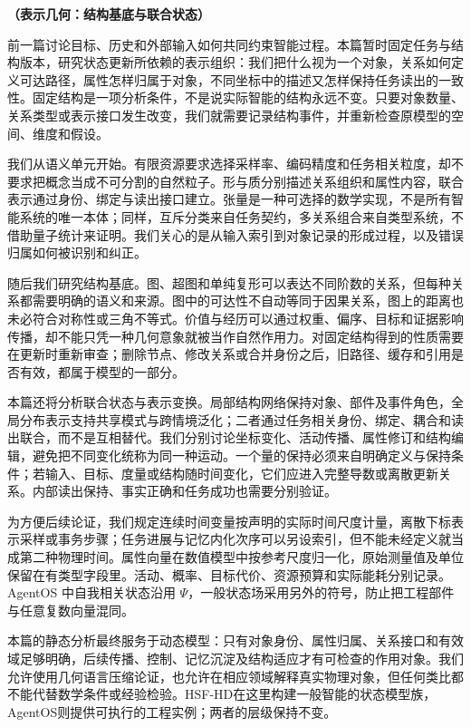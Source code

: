 \label{part:geometry}

\textbf{（表示几何：结构基底与联合状态）}


前一篇讨论目标、历史和外部输入如何共同约束智能过程。本篇暂时固定任务与结构版本，研究状态更新所依赖的表示组织：我们把什么视为一个对象，关系如何定义可达路径，属性怎样归属于对象，不同坐标中的描述又怎样保持任务读出的一致性。固定结构是一项分析条件，不是说实际智能的结构永远不变。只要对象数量、关系类型或表示接口发生改变，我们就需要记录结构事件，并重新检查原模型的空间、维度和假设。

我们从语义单元开始。有限资源要求选择采样率、编码精度和任务相关粒度，却不要求把概念当成不可分割的自然粒子。形与质分别描述关系组织和属性内容，联合表示通过身份、绑定与读出接口建立。张量是一种可选择的数学实现，不是所有智能系统的唯一本体；同样，互斥分类来自任务契约，多关系组合来自类型系统，不借助量子统计来证明。我们关心的是从输入索引到对象记录的形成过程，以及错误归属如何被识别和纠正。

随后我们研究结构基底。图、超图和单纯复形可以表达不同阶数的关系，但每种关系都需要明确的语义和来源。图中的可达性不自动等同于因果关系，图上的距离也未必符合对称性或三角不等式。价值与经历可以通过权重、偏序、目标和证据影响传播，却不能只凭一种几何意象就被当作自然作用力。对固定结构得到的性质需要在更新时重新审查；删除节点、修改关系或合并身份之后，旧路径、缓存和引用是否有效，都属于模型的一部分。

本篇还将分析联合状态与表示变换。局部结构网络保持对象、部件及事件角色，全局分布表示支持共享模式与跨情境泛化；二者通过任务相关身份、绑定、耦合和读出联合，而不是互相替代。我们分别讨论坐标变化、活动传播、属性修订和结构编辑，避免把不同变化统称为同一种运动。一个量的保持必须来自明确定义与保持条件；若输入、目标、度量或结构随时间变化，它们应进入完整导数或离散更新关系。内部读出保持、事实正确和任务成功也需要分别验证。

为方便后续论证，我们规定连续时间变量按声明的实际时间尺度计量，离散下标表示采样或事务步骤；任务进展与记忆内化次序可以另设索引，但不能未经定义就当成第二种物理时间。属性向量在数值模型中按参考尺度归一化，原始测量值及单位保留在有类型字段里。活动、概率、目标代价、资源预算和实际能耗分别记录。AgentOS 中自我相关状态沿用 $\Psi$，一般状态场采用另外的符号，防止把工程部件与任意复数向量混同。

本篇的静态分析最终服务于动态模型：只有对象身份、属性归属、关系接口和有效域足够明确，后续传播、控制、记忆沉淀及结构适应才有可检查的作用对象。我们允许使用几何语言压缩论证，也允许在相应领域解释真实物理对象，但任何类比都不能代替数学条件或经验检验。HSF-HD在这里构建一般智能的状态模型族，AgentOS则提供可执行的工程实例；两者的层级保持不变。
